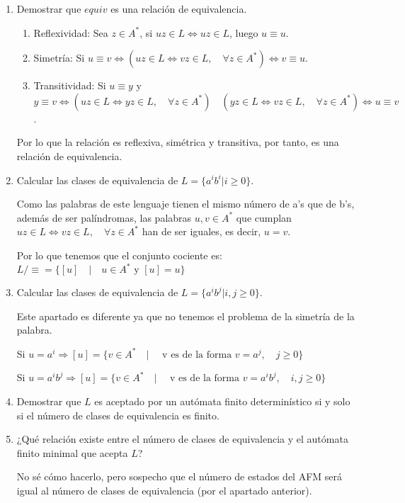 \documentclass[a4paper, 11pt]{article}
\begin{document}
\begin{enumerate}
\item Demostrar que $equiv$ es una relación de equivalencia.

\begin{enumerate}
\item Reflexividad: Sea $z\in A^*$, si $uz\in L \Longleftrightarrow uz\in L$, luego $u\equiv u$.
\item Simetría: Si $u\equiv v \Longleftrightarrow (uz\in L \Longleftrightarrow vz\in L, \quad \forall z \in A^*) \Longleftrightarrow v\equiv u$.
\item Transitividad: Si $u\equiv y $ y $y\equiv v \Longleftrightarrow (uz\in L \Longleftrightarrow yz\in L, \quad \forall z \in A^*) \quad (yz\in L \Longleftrightarrow vz\in L, \quad \forall z \in A^*) \Longleftrightarrow u \equiv v$. 
\end{enumerate}

Por lo que la relación es reflexiva, simétrica y transitiva, por tanto, es una relación de equivalencia.

\item Calcular las clases de equivalencia de $L=\{a^ib^i|i\geq 0\}$.

Como las palabras de este lenguaje tienen el mismo número de a's que de b's, además de ser palíndromas, las palabras $u,v \in A^*$ que cumplan $uz\in L \Longleftrightarrow vz\in L, \quad \forall z \in A^*$ han de ser iguales, es decir, $u=v$.

Por lo que tenemos que el conjunto cociente es: $L/\equiv = \{[u] \quad | \quad u \in A^* \text{ y } [u]=u\}$

\item Calcular las clases de equivalencia de $L=\{a^ib^j|i,j\geq 0\}$.

Este apartado es diferente ya que no tenemos el problema de la simetría de la palabra.

Si $u=a^i \Longrightarrow [u] = \{v \in A^* \quad | \quad \text{ v es de la forma } v=a^j, \quad j \geq0\}$

Si $u=a^ib^j \Longrightarrow [u] = \{v \in A^* \quad | \quad \text{ v es de la forma } v=a^ib^j, \quad i,j \geq0\}$

\item Demostrar que $L$ es aceptado por un autómata finito determinístico si y solo si el número de clases de equivalencia es finito.

\item ¿Qué relación existe entre el número de clases de equivalencia y el autómata finito minimal que acepta $L$?

No sé cómo hacerlo, pero sospecho que el número de estados del AFM será igual al número de clases de equivalencia (por el apartado anterior).

\end{enumerate}
\end{document}
